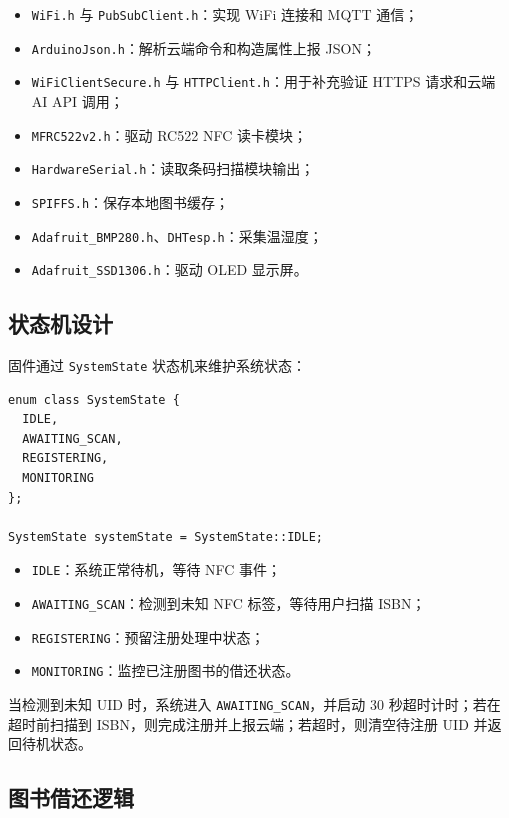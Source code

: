 \documentclass[12pt,hyperref,a4paper,UTF8]{ctexart}
\begin{document}
\begin{itemize}
    \item \texttt{WiFi.h} 与 \texttt{PubSubClient.h}：实现 WiFi 连接和 MQTT 通信；
    \item \texttt{ArduinoJson.h}：解析云端命令和构造属性上报 JSON；
    \item \texttt{WiFiClientSecure.h} 与 \texttt{HTTPClient.h}：用于补充验证 HTTPS 请求和云端 AI API 调用；
    \item \texttt{MFRC522v2.h}：驱动 RC522 NFC 读卡模块；
    \item \texttt{HardwareSerial.h}：读取条码扫描模块输出；
    \item \texttt{SPIFFS.h}：保存本地图书缓存；
    \item \texttt{Adafruit\_BMP280.h}、\texttt{DHTesp.h}：采集温湿度；
    \item \texttt{Adafruit\_SSD1306.h}：驱动 OLED 显示屏。
\end{itemize}

\subsection{状态机设计}

固件通过 \texttt{SystemState} 状态机来维护系统状态：

\begin{lstlisting}
enum class SystemState {
  IDLE,
  AWAITING_SCAN,
  REGISTERING,
  MONITORING
};

SystemState systemState = SystemState::IDLE;
\end{lstlisting}

\begin{itemize}
    \item \texttt{IDLE}：系统正常待机，等待 NFC 事件；
    \item \texttt{AWAITING\_SCAN}：检测到未知 NFC 标签，等待用户扫描 ISBN；
    \item \texttt{REGISTERING}：预留注册处理中状态；
    \item \texttt{MONITORING}：监控已注册图书的借还状态。
\end{itemize}

当检测到未知 UID 时，系统进入 \texttt{AWAITING\_SCAN}，并启动 30 秒超时计时；若在超时前扫描到 ISBN，则完成注册并上报云端；若超时，则清空待注册 UID 并返回待机状态。

\subsection{图书借还逻辑}
\end{document}
